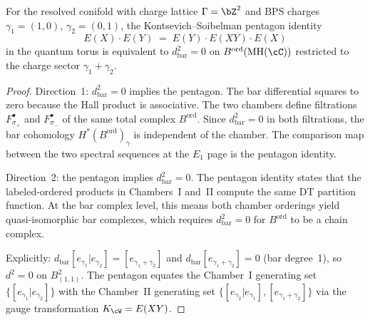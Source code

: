 \begin{proposition}[Pentagon identity \texorpdfstring{$=$}{=} \texorpdfstring{$d_{\mathrm{bar}}^2 = 0$}{d-bar-2 = 0}]
\label{prop:ks-bar-pentagon}
For the resolved conifold with charge lattice $\Gamma = \bZ^2$ and BPS charges $\gamma_1 = (1,0)$, $\gamma_2 = (0,1)$, the Kontsevich--Soibelman pentagon identity
\[
 E(X) \cdot E(Y) \;=\; E(Y) \cdot E(XY) \cdot E(X)
\]
in the quantum torus is equivalent to $d_{\mathrm{bar}}^2 = 0$ on $B^{\mathrm{ord}}(\mathrm{MH}(\cC))$ restricted to the charge sector $\gamma_1 + \gamma_2$.

\begin{proof}
Direction~1: $d_{\mathrm{bar}}^2 = 0$ implies the pentagon. The bar differential squares to zero because the Hall product is associative. The two chambers define filtrations $F^\bullet_{\sigma_+}$ and $F^\bullet_{\sigma_-}$ of the same total complex $B^{\mathrm{ord}}$. Since $d_{\mathrm{bar}}^2 = 0$ in both filtrations, the bar cohomology $H^\ast(B^{\mathrm{ord}})_\gamma$ is independent of the chamber. The comparison map between the two spectral sequences at the $E_1$ page is the pentagon identity.

Direction~2: the pentagon implies $d_{\mathrm{bar}}^2 = 0$. The pentagon identity states that the labeled-ordered products in Chambers~I and~II compute the same DT partition function. At the bar complex level, this means both chamber orderings yield quasi-isomorphic bar complexes, which requires $d_{\mathrm{bar}}^2 = 0$ for $B^{\mathrm{ord}}$ to be a chain complex.

Explicitly: $d_{\mathrm{bar}}[e_{\gamma_1} | e_{\gamma_2}] = [e_{\gamma_1 + \gamma_2}]$ and $d_{\mathrm{bar}}[e_{\gamma_1 + \gamma_2}] = 0$ (bar degree~1), so $d^2 = 0$ on $B^2_{(1,1)}$. The pentagon equates the Chamber~I generating set $\{[e_{\gamma_1} | e_{\gamma_2}]\}$ with the Chamber~II generating set $\{[e_{\gamma_2} | e_{\gamma_1}], [e_{\gamma_1 + \gamma_2}]\}$ via the gauge transformation $K_\cW = E(XY)$.
\end{proof}
\end{proposition}

